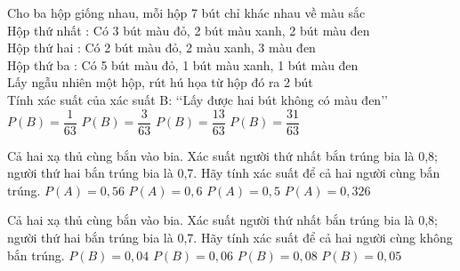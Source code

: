 \begin{ex}
Cho ba hộp giống nhau, mỗi hộp 7 bút chỉ khác nhau về màu sắc\\
Hộp thứ nhất : Có 3 bút màu đỏ, 2 bút màu xanh, 2 bút màu đen\\
Hộp thứ hai : Có 2 bút màu đỏ, 2 màu xanh, 3 màu đen\\
Hộp thứ ba : Có 5 bút màu đỏ, 1 bút màu xanh, 1 bút màu đen\\
Lấy ngẫu nhiên một hộp, rút hú họa từ hộp đó ra 2 bút\\
Tính xác suất của xác suất B: \lq\lq  Lấy được hai bút không có màu đen\rq\rq 
\choice
{$P(B)=\dfrac{1}{63}$}
{$P(B)=\dfrac{3}{63}$}
{$P(B)=\dfrac{13}{63}$}
{\True $P(B)=\dfrac{31}{63}$}
\end{ex}
\begin{ex}
Cả hai xạ thủ cùng bắn vào bia. Xác suất người thứ nhất bắn trúng bia là 0{,}8; người thứ hai bắn trúng bia là 0{,}7. Hãy tính xác suất để cả hai người cùng bắn trúng.
\choice
{\True $P(A)=0{,}56$}
{$P(A)=0{,}6$}
{$P(A)=0{,}5$}
{$P(A)=0{,}326$}
\end{ex}
\begin{ex}
Cả hai xạ thủ cùng bắn vào bia. Xác suất người thứ nhất bắn trúng bia là 0{,}8; người thứ hai bắn trúng bia là 0{,}7. Hãy tính xác suất để cả hai người cùng không bắn trúng.
\choice
{$P(B)=0{,}04$}
{\True $P(B)=0{,}06$}
{$P(B)=0{,}08$}
{$P(B)=0{,}05$}
\end{ex}
